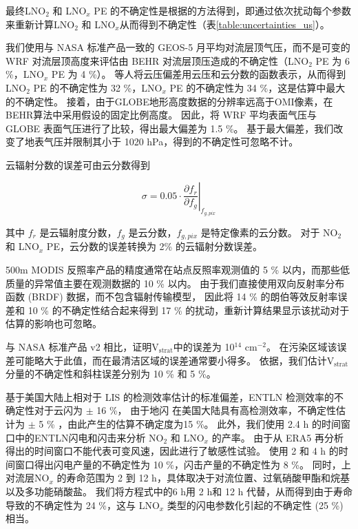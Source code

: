 最终LNO$_2$ 和 LNO$_x$ PE 的不确定性是根据\citet{Pickering.2016,Allen.2019,Bucsela.2019,Lapierre.2020}的方法得到，即通过依次扰动每个参数来重新计算LNO$_2$ 和 LNO$_x$从而得到不确定性（表\ref{table:uncertainties_us}）。

我们使用与 NASA 标准产品一致的 GEOS-5 月平均对流层顶气压，而不是可变的 WRF 对流层顶高度来评估由 BEHR 对流层顶压造成的不确定性（LNO$_2$ PE 为 6 \%，LNO$_x$ PE 为 4 \%）。
\citet{Acarreta.2004}等人将云压偏差用云压和云分数的函数表示，从而得到LNO$_2$ PE 的不确定性为 32 \%，LNO$_x$ PE 的不确定性为 34 \%，这是估算中最大的不确定性。
接着，由于GLOBE地形高度数据的分辨率远高于OMI像素，在BEHR算法中采用假设的固定比例高度。
因此，\citet{Laughner.2019a}将 WRF 平均表面气压与 GLOBE 表面气压进行了比较，得出最大偏差为 1.5 \%。
基于最大偏差，我们改变了地表气压并限制其小于 1020 hPa，得到的不确定性可忽略不计。

云辐射分数的误差可由云分数得到

\begin{equation}
\sigma = 0.05 \cdot \left.\frac{\partial{f_r}}{\partial{f_g}}\right|_{f_{g,pix}}
\end{equation}

其中 $f_r$ 是云辐射度分数，$f_g$ 是云分数，$f_{g,pix}$ 是特定像素的云分数。
对于 NO$_2$ 和 LNO$_x$ PE，云分数的误差转换为 2\% 的云辐射分数误差。

500m MODIS 反照率产品的精度通常在站点反照率观测值的 5 \% 以内，而那些低质量的异常值主要在观测数据的 10 \% 以内\citep{Schaaf.2011}。
由于我们直接使用双向反射率分布函数 (BRDF) 数据，而不包含辐射传输模型，
因此将 14 \% 的朗伯等效反射率误差和 10 \% 的不确定性结合起来得到 17 \% 的扰动\citep{Laughner.2019a}，重新计算结果显示该扰动对于估算的影响也可忽略。

与 NASA 标准产品 v2 相比，\citet{Krotkov.2017}证明V$_\textrm{strat}$中的误差为 10$^{14}$ cm$^{-2}$。
在污染区域该误差可能略大于此值，而在最清洁区域的误差通常要小得多\citep{Bucsela.2013}。
依据\citet{Allen.2019}，我们估计V$_\textrm{strat}$分量的不确定性和斜柱误差分别为 10 \% 和 5 \%。

基于美国大陆上相对于 LIS 的检测效率估计的标准偏差，ENTLN 检测效率的不确定性对于云闪为 $\pm$ 16 \%，
由于地闪 在美国大陆具有高检测效率，不确定性估计为 $\pm$ 5 \% \citep{Lapierre.2020}，由此产生的估算不确定度为15 \%。
此外，我们使用 2.4 h 的时间窗口中的ENTLN闪电和闪击来分析 NO$_2$ 和 LNO$_x$ 的产率。
由于从 ERA5 再分析得出的时间窗口不能代表可变风速，因此进行了敏感性试验。
使用 2 和 4 h 的时间窗口得出闪电产量的不确定性为 10 \%，闪击产量的不确定性为 8 \%。
同时，上对流层NO$_x$ 的寿命范围为 2 到 12 h，具体取决于对流位置、过氧硝酸甲酯和烷基以及多功能硝酸盐\citep{Nault.2017}。
我们将方程式中的6 h用 2 h和 12 h 代替，从而得到由于寿命导致的不确定性为 24 \%，这与 LNO$_x$ 类型的闪电参数化引起的不确定性 (25 \%) 相当。

